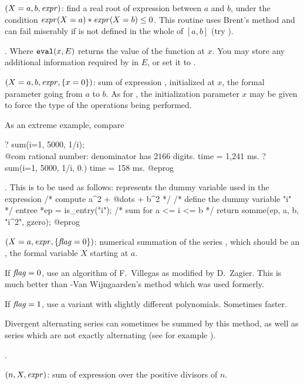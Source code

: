 $(X=a,b,\hbox{\it expr\/})$: find a real root of expression
 between $a$ and $b$, under the condition
$\hbox{\it expr\/}(X=a) * \hbox{\it expr\/}(X=b) \le 0$.
This routine uses Brent's method and can fail miserably if  is
not defined in the whole of $[a,b]$ (try ).

.
Where ${\tt eval}(x, E)$ returns the value of the function at $x$. You
may store any additional information required by  in $E$, or set it
to .

$(X=a,b,\hbox{\it expr\/},\{x=0\})$: sum of expression ,
initialized at $x$, the formal parameter going from $a$ to $b$. As for
, the initialization parameter $x$ may be given to force the type
of the operations being performed.

\noindent As an extreme example, compare

\bprog
? sum(i=1, 5000, 1/i); \\@com rational number: denominator has $2166$ digits.
time = 1,241 ms.
? sum(i=1, 5000, 1/i, 0.)
time = 158 ms.
@eprog

. This is to be
used as follows:  represents the dummy variable used in the
expression 
\bprog
/* compute a^2 + @dots + b^2 */
{
  /* define the dummy variable "i" */
  entree *ep = is_entry("i");
  /* sum for a <= i <= b */
  return somme(ep, a, b, "i^2", gzero);
}
@eprog

$(X=a,\hbox{\it expr\/},\{\hbox{\it f\kern0pt lag\/}=0\})$: numerical summation of the
series , which should be an , the formal
variable $X$ starting at $a$.

If $\hbox{\it f\kern0pt lag\/}=0$, use an algorithm of F.~Villegas as modified by D.~Zagier. This
is much better than -Van Wijngaarden's method which was used
formerly.

If $\hbox{\it f\kern0pt lag\/}=1$, use a variant with slightly different polynomials. Sometimes
faster.

Divergent alternating series can sometimes be summed by this method, as well
as series which are not exactly alternating (see for example
).

.

$(n,X,\hbox{\it expr\/})$: sum of expression  over
the positive divisors of $n$.

